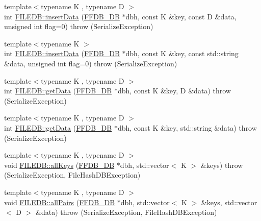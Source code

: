 \begin{DoxyCompactItemize}
\item 
{\footnotesize template$<$typename K , typename D $>$ }\\int \mbox{\hyperlink{namespaceFILEDB_a63f788f0f11a571f254ac8cfa8d19132}{F\+I\+L\+E\+D\+B\+::insert\+Data}} (\mbox{\hyperlink{adat-devel_2other__libs_2filedb_2filehash_2ffdb__db_8h_a0b27b956926453a7a8141ea8e10f0df8}{F\+F\+D\+B\+\_\+\+DB}} $\ast$dbh, const K \&key, const D \&data, unsigned int flag=0)  throw (\+Serialize\+Exception)
\item 
{\footnotesize template$<$typename K $>$ }\\int \mbox{\hyperlink{namespaceFILEDB_aeadc0ee930c4a7b2ddae220799008bd6}{F\+I\+L\+E\+D\+B\+::insert\+Data}} (\mbox{\hyperlink{adat-devel_2other__libs_2filedb_2filehash_2ffdb__db_8h_a0b27b956926453a7a8141ea8e10f0df8}{F\+F\+D\+B\+\_\+\+DB}} $\ast$dbh, const K \&key, const std\+::string \&data, unsigned int flag=0)  throw (\+Serialize\+Exception)
\item 
{\footnotesize template$<$typename K , typename D $>$ }\\int \mbox{\hyperlink{namespaceFILEDB_a0d18d10ad6d490786b6fe538fbd45dc3}{F\+I\+L\+E\+D\+B\+::get\+Data}} (\mbox{\hyperlink{adat-devel_2other__libs_2filedb_2filehash_2ffdb__db_8h_a0b27b956926453a7a8141ea8e10f0df8}{F\+F\+D\+B\+\_\+\+DB}} $\ast$dbh, const K \&key, D \&data)  throw (\+Serialize\+Exception)
\item 
{\footnotesize template$<$typename K , typename D $>$ }\\int \mbox{\hyperlink{namespaceFILEDB_a7381d9e3dd76dc6eb741797e16c3052c}{F\+I\+L\+E\+D\+B\+::get\+Data}} (\mbox{\hyperlink{adat-devel_2other__libs_2filedb_2filehash_2ffdb__db_8h_a0b27b956926453a7a8141ea8e10f0df8}{F\+F\+D\+B\+\_\+\+DB}} $\ast$dbh, const K \&key, std\+::string \&data)  throw (\+Serialize\+Exception)
\item 
{\footnotesize template$<$typename K , typename D $>$ }\\void \mbox{\hyperlink{namespaceFILEDB_a3d87ecce7111516944b8b8e532aad4ea}{F\+I\+L\+E\+D\+B\+::all\+Keys}} (\mbox{\hyperlink{adat-devel_2other__libs_2filedb_2filehash_2ffdb__db_8h_a0b27b956926453a7a8141ea8e10f0df8}{F\+F\+D\+B\+\_\+\+DB}} $\ast$dbh, std\+::vector$<$ K $>$ \&keys)  throw (\+Serialize\+Exception, File\+Hash\+D\+B\+Exception)
\item 
{\footnotesize template$<$typename K , typename D $>$ }\\void \mbox{\hyperlink{namespaceFILEDB_a94222bc861d65f1c5f139529a5643cd4}{F\+I\+L\+E\+D\+B\+::all\+Pairs}} (\mbox{\hyperlink{adat-devel_2other__libs_2filedb_2filehash_2ffdb__db_8h_a0b27b956926453a7a8141ea8e10f0df8}{F\+F\+D\+B\+\_\+\+DB}} $\ast$dbh, std\+::vector$<$ K $>$ \&keys, std\+::vector$<$ D $>$ \&data)  throw (\+Serialize\+Exception, File\+Hash\+D\+B\+Exception)

\end{DoxyCompactItemize}
